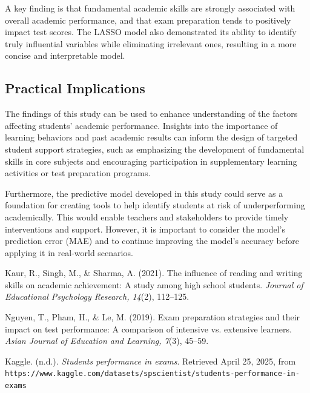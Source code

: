 \documentclass[a4paper,12pt]{article}
\begin{document}
	A key finding is that fundamental academic skills are strongly associated with overall academic performance, and that exam preparation tends to positively impact test scores. The LASSO model also demonstrated its ability to identify truly influential variables while eliminating irrelevant ones, resulting in a more concise and interpretable model.

	\subsection{Practical Implications}

	The findings of this study can be used to enhance understanding of the factors affecting students’ academic performance. Insights into the importance of learning behaviors and past academic results can inform the design of targeted student support strategies, such as emphasizing the development of fundamental skills in core subjects and encouraging participation in supplementary learning activities or test preparation programs.

	Furthermore, the predictive model developed in this study could serve as a foundation for creating tools to help identify students at risk of underperforming academically. This would enable teachers and stakeholders to provide timely interventions and support. However, it is important to consider the model's prediction error (MAE) and to continue improving the model’s accuracy before applying it in real-world scenarios.

	
\newpage
\begin{thebibliography}{9}
	
	Kaur, R., Singh, M., \& Sharma, A. (2021). The influence of reading and writing skills on academic achievement: A study among high school students. \textit{Journal of Educational Psychology Research, 14}(2), 112--125.
	
	Nguyen, T., Pham, H., \& Le, M. (2019). Exam preparation strategies and their impact on test performance: A comparison of intensive vs. extensive learners. \textit{Asian Journal of Education and Learning, 7}(3), 45--59.
	
	Kaggle. (n.d.). \textit{Students performance in exams}. Retrieved April 25, 2025, from \texttt{https://www.kaggle.com/datasets/spscientist/students-performance-in-exams}
	
\end{thebibliography}
\end{document}
